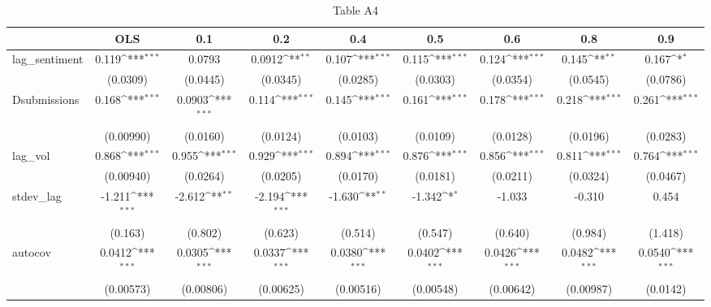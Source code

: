 \begin{table}[htbp]\centering
\def\sym#1{\ifmmode^{#1}\else\(^{#1}\)\fi}
\caption{Table A4}
\begin{tabular}{l*{8}{c}}
\hline\hline
                &\multicolumn{1}{c}{OLS}&\multicolumn{1}{c}{0.1}&\multicolumn{1}{c}{0.2}&\multicolumn{1}{c}{0.4}&\multicolumn{1}{c}{0.5}&\multicolumn{1}{c}{0.6}&\multicolumn{1}{c}{0.8}&\multicolumn{1}{c}{0.9}\\
\hline
lag\_sentiment   &    0.119\sym{***}&   0.0793         &   0.0912\sym{**} &    0.107\sym{***}&    0.115\sym{***}&    0.124\sym{***}&    0.145\sym{**} &    0.167\sym{*}  \\
                & (0.0309)         & (0.0445)         & (0.0345)         & (0.0285)         & (0.0303)         & (0.0354)         & (0.0545)         & (0.0786)         \\
[1em]
Dsubmissions    &    0.168\sym{***}&   0.0903\sym{***}&    0.114\sym{***}&    0.145\sym{***}&    0.161\sym{***}&    0.178\sym{***}&    0.218\sym{***}&    0.261\sym{***}\\
                &(0.00990)         & (0.0160)         & (0.0124)         & (0.0103)         & (0.0109)         & (0.0128)         & (0.0196)         & (0.0283)         \\
[1em]
lag\_vol         &    0.868\sym{***}&    0.955\sym{***}&    0.929\sym{***}&    0.894\sym{***}&    0.876\sym{***}&    0.856\sym{***}&    0.811\sym{***}&    0.764\sym{***}\\
                &(0.00940)         & (0.0264)         & (0.0205)         & (0.0170)         & (0.0181)         & (0.0211)         & (0.0324)         & (0.0467)         \\
[1em]
stdev\_lag       &   -1.211\sym{***}&   -2.612\sym{**} &   -2.194\sym{***}&   -1.630\sym{**} &   -1.342\sym{*}  &   -1.033         &   -0.310         &    0.454         \\
                &  (0.163)         &  (0.802)         &  (0.623)         &  (0.514)         &  (0.547)         &  (0.640)         &  (0.984)         &  (1.418)         \\
[1em]
autocov         &   0.0412\sym{***}&   0.0305\sym{***}&   0.0337\sym{***}&   0.0380\sym{***}&   0.0402\sym{***}&   0.0426\sym{***}&   0.0482\sym{***}&   0.0540\sym{***}\\
                &(0.00573)         &(0.00806)         &(0.00625)         &(0.00516)         &(0.00548)         &(0.00642)         &(0.00987)         & (0.0142)         \\

\end{tabular}
\end{table}
